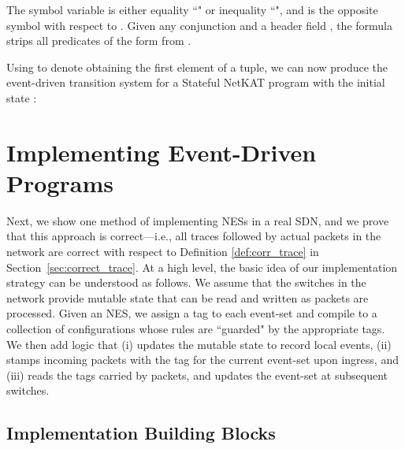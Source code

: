 \documentclass[pldi-cameraready]{sigplanconf}
\begin{document}
\noindent
The symbol variable  is either equality ``" or inequality ``",
and  is the opposite symbol with respect to .
Given any conjunction  and a header field , the formula 
 strips all predicates of the form  from .






Using  to denote obtaining the first element of a tuple, we can now produce the
event-driven transition system for a Stateful NetKAT program  with the initial state :











\section{Implementing Event-Driven Programs}
\label{sec:implementing}

Next, we show one method of implementing NESs in a real SDN, and we prove that
this approach is correct---i.e., all traces followed by actual packets
in the network are correct with respect to Definition \ref{def:corr_trace} in Section~\ref{sec:correct_trace}.
At a high level, the basic idea of our implementation strategy can be
understood as follows. We assume that the switches in the network
provide mutable state that can be read and written as packets are
processed. Given an NES, we assign a tag to each event-set and compile
to a collection of configurations whose rules are ``guarded" by the
appropriate tags. We then add logic that (i) updates the mutable state to
record local events, (ii) stamps incoming packets with the tag for
the current event-set upon ingress, and (iii) reads the tags carried
by packets, and updates the event-set at subsequent switches.



\subsection{Implementation Building Blocks}
\label{subsec:building_blocks}
\end{document}
